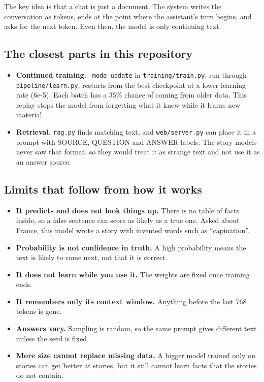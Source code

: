 \documentclass[11pt,a4paper]{article}
\newcommand{\code}[1]{\texttt{#1}}
\begin{document}
The key idea is that a chat is just a document. The system writes the conversation as tokens, ends at the point where the assistant's turn begins, and asks for the next token. Even then, the model is only continuing text.

\subsection*{The closest parts in this repository}
{}

\begin{itemize}
\item \textbf{Continued training.} \code{--mode update} in \code{training/\allowbreak{}train.\allowbreak{}py}, run through \code{pipeline/\allowbreak{}learn.\allowbreak{}py}, restarts from the best checkpoint at a lower learning rate (6e-5). Each batch has a 35\% chance of coming from older data. This replay stops the model from forgetting what it knew while it learns new material.
\item \textbf{Retrieval.} \code{rag.\allowbreak{}py} finds matching text, and \code{web/\allowbreak{}server.\allowbreak{}py} can place it in a prompt with SOURCE, QUESTION and ANSWER labels. The story models never saw that format, so they would treat it as strange text and not use it as an answer source.
\end{itemize}

\subsection*{Limits that follow from how it works}
{}

\begin{itemize}
\item \textbf{It predicts and does not look things up.} There is no table of facts inside, so a false sentence can score as likely as a true one. Asked about France, this model wrote a story with invented words such as “capination”.
\item \textbf{Probability is not confidence in truth.} A high probability means the text is likely to come next, not that it is correct.
\item \textbf{It does not learn while you use it.} The weights are fixed once training ends.
\item \textbf{It remembers only its context window.} Anything before the last 768 tokens is gone.
\item \textbf{Answers vary.} Sampling is random, so the same prompt gives different text unless the seed is fixed.
\item \textbf{More size cannot replace missing data.} A bigger model trained only on stories can get better at stories, but it still cannot learn facts that the stories do not contain.
\end{itemize}
\end{document}
